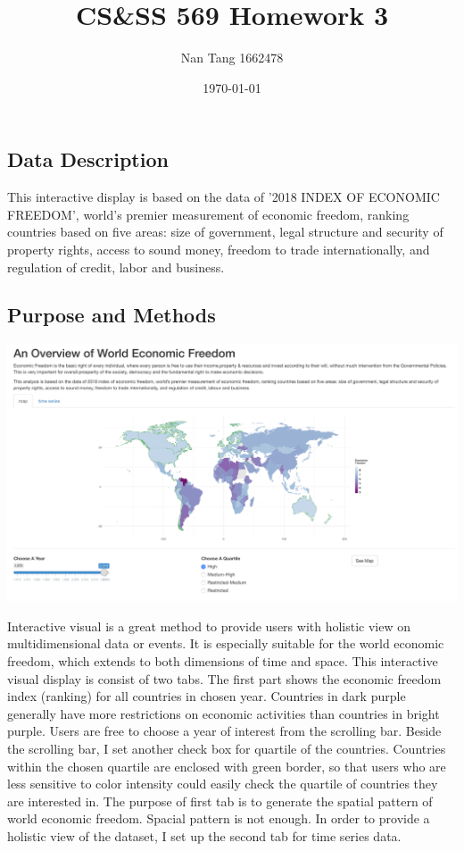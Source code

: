\documentclass[11pt,letterpaper]{article}
\title{CS\&SS 569 Homework 3}
\author{Nan Tang 1662478}
\date{\today}
\begin{document}
\maketitle 

\subsection*{Data Description} 
\noindent This interactive display is based on the data of '2018 INDEX OF ECONOMIC FREEDOM', world’s premier measurement of economic freedom, ranking countries based on five areas: size of government, legal structure and security of property rights, access to sound money, freedom to trade internationally, and regulation of credit, labor and business. 

\subsection*{Purpose and Methods}

\includegraphics[width=6.5in]{hw3-1.png} 

\noindent Interactive visual is a great method to provide users with holistic view on multidimensional data or events. It is especially suitable for the world economic freedom, which extends to both dimensions of time and space. This interactive visual display is consist of two tabs. The first part shows the economic freedom index (ranking) for all countries in chosen year. Countries in dark purple generally have more restrictions on economic activities than countries in bright purple. Users are free to choose a year of interest from the scrolling bar. Beside the scrolling bar, I set another check box for quartile of the countries. Countries within the chosen quartile are enclosed with green border, so that users who are less sensitive to color intensity could easily check the quartile of countries they are interested in. The purpose of first tab is to generate the spatial pattern of world economic freedom. Spacial pattern is not enough. In order to provide a holistic view of the dataset, I set up the second tab for time series data. \\
\end{document}
